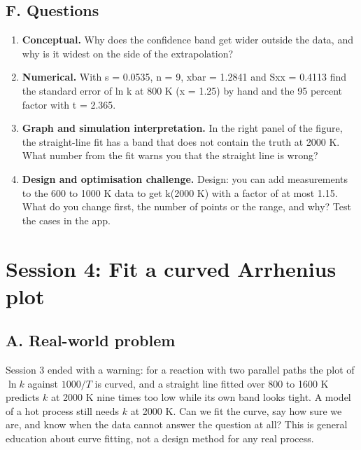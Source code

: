 \documentclass[11pt,a4paper]{article}
\begin{document}
\subsection*{F. Questions}
\begin{enumerate}[nosep]
\item \textbf{Conceptual.} Why does the confidence band get wider outside the data, and why is it widest on the side of the extrapolation?
\item \textbf{Numerical.} With s = 0.0535, n = 9, xbar = 1.2841 and Sxx = 0.4113 find the standard error of ln k at 800 K (x = 1.25) by hand and the 95 percent factor with t = 2.365.
\item \textbf{Graph and simulation interpretation.} In the right panel of the figure, the straight-line fit has a band that does not contain the truth at 2000 K. What number from the fit warns you that the straight line is wrong?
\item \textbf{Design and optimisation challenge.} Design: you can add measurements to the 600 to 1000 K data to get k(2000 K) with a factor of at most 1.15. What do you change first, the number of points or the range, and why? Test the cases in the app.
\end{enumerate}

\section{Session 4: Fit a curved Arrhenius plot}

\subsection*{A. Real-world problem}
Session 3 ended with a warning: for a reaction with two parallel paths the plot of $\ln k$ against $1000/T$ is curved, and a straight line fitted over 800 to 1600 K predicts $k$ at 2000 K nine times too low while its own band looks tight. A model of a hot process still needs $k$ at 2000 K. Can we fit the curve, say how sure we are, and know when the data cannot answer the question at all? This is general education about curve fitting, not a design method for any real process.
\end{document}
